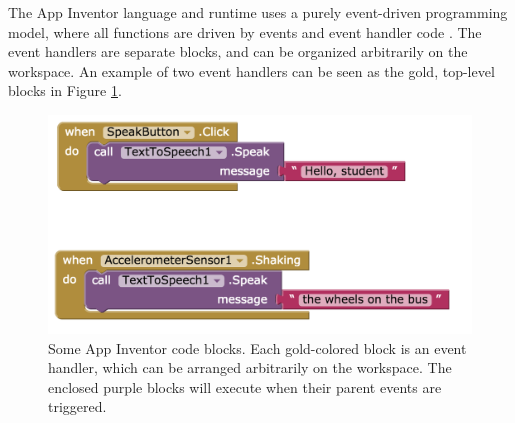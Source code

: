 The App Inventor language and runtime uses a purely event-driven programming model, where all functions are driven by events and event handler code \citep{turbak-2014}. The event handlers are separate blocks, and can be organized arbitrarily on the workspace. An example of two event handlers can be seen as the gold, top-level blocks in Figure \ref{fig:debug0ch2}. 

\begin{figure}
  \centering
      \includegraphics[width=\textwidth]{images/debugActivity/debug0start}
  \caption[Some App Inventor Code Blocks]{Some App Inventor code blocks. Each gold-colored block is an event handler, which can be arranged arbitrarily on the workspace. The enclosed purple blocks will execute when their parent events are triggered.}
  \label{fig:debug0ch2}
\end{figure}




